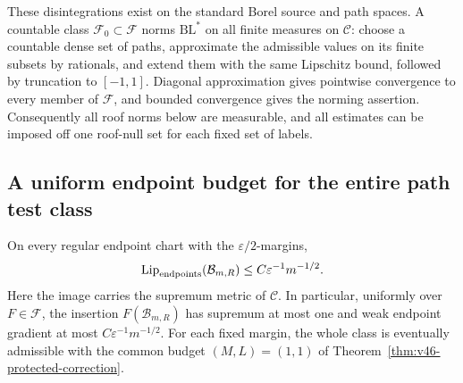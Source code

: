 These disintegrations exist on the standard Borel source and path
spaces. A countable class $\mathcal F_0\subset\mathcal F$ norms
$\mathrm{BL}^*$ on all finite measures on $\mathcal C$: choose a
countable dense set of paths, approximate the admissible values on
its finite subsets by rationals, and extend them with the same
Lipschitz bound, followed by truncation to $[-1,1]$. Diagonal
approximation gives pointwise convergence to every member of
$\mathcal F$, and bounded convergence gives the norming assertion.
Consequently all roof norms below are measurable, and all estimates
can be imposed off one roof-null set for each fixed set of labels.

\subsection{A uniform endpoint budget for the entire path test class}
\begin{lemma}
\label{lem:v52-path-endpoint-budget}
On every regular endpoint chart with the $\varepsilon/2$-margins,
\begin{equation}\label{eq:v52-path-endpoint-budget}
 \operatorname{Lip}_{\rm endpoints}(\mathcal B_{m,R})
                    \le C\varepsilon^{-1}m^{-1/2}.
\end{equation}
Here the image carries the supremum metric of $\mathcal C$.
In particular, uniformly over $F\in\mathcal F$, the insertion
$F(\mathcal B_{m,R})$ has supremum at most one and weak endpoint
gradient at most $C\varepsilon^{-1}m^{-1/2}$.
For each fixed margin, the whole class is eventually admissible
with the common budget $(M,L)=(1,1)$ of
Theorem~\ref{thm:v46-protected-correction}.
\end{lemma}
